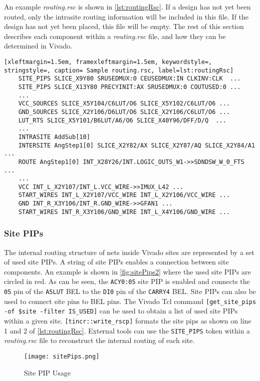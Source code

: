 \noindent An example \textit{routing.rsc} is shown in \autoref{lst:routingRsc}.
If a design has not yet been routed, only the intrasite routing information will be
included in this file. If the design has not yet been placed, this file will be
empty. The rest of this section describes each component within a
\textit{routing.rsc} file, and how they can be determined in Vivado.

\begin{lstlisting}[xleftmargin=1.5em, framexleftmargin=1.5em, keywordstyle=,
stringstyle=, caption= Sample routing.rsc, label=lst:routingRsc]
	SITE_PIPS SLICE_X9Y80 SRUSEDMUX:0 CEUSEDMUX:IN CLKINV:CLK  ...
	SITE_PIPS SLICE_X13Y80 PRECYINIT:AX SRUSEDMUX:0 COUTUSED:0 ...
	...
	VCC_SOURCES SLICE_X5Y104/C6LUT/O6 SLICE_X5Y102/C6LUT/O6 ...
	GND_SOURCES SLICE_X2Y106/D6LUT/O6 SLICE_X2Y106/C6LUT/O6 ...
	LUT_RTS SLICE_X5Y101/B6LUT/A6/O6 SLICE_X40Y96/DFF/D/Q  ...
	...
	INTRASITE AddSub[10]
	INTERSITE AngStep1[0] SLICE_X2Y82/AX SLICE_X2Y87/AQ SLICE_X2Y84/A1 ... 
	ROUTE AngStep1[0] INT_X28Y26/INT.LOGIC_OUTS_W1->>SDNDSW_W_0_FTS ...
	...
	VCC INT_L_X2Y107/INT_L.VCC_WIRE->>IMUX_L42 ...
	START_WIRES INT_L_X2Y107/VCC_WIRE INT_L_X2Y106/VCC_WIRE ...
	GND INT_R_X3Y106/INT_R.GND_WIRE->>GFAN1 ...
	START_WIRES INT_R_X3Y106/GND_WIRE INT_L_X4Y106/GND_WIRE ...
\end{lstlisting}

\subsubsection{Site PIPs}

The internal routing structure of nets inside Vivado sites are represented by
a set of used site PIPs. A string of site PIPs enables a connection between site
components. An example is shown in \autoref{fig:sitePips2} where the used site
PIPs are circled in red. As can be seen, the \texttt{ACY0:05} site PIP is
enabled and connects the \texttt{05} pin of the \texttt{A5LUT} BEL to the
\texttt{DI0} pin of the \texttt{CARRY4} BEL. Site PIPs can also be used to 
connect site pins to BEL pins. The Vivado Tcl command \texttt{[get\_site\_pips -of \$site -filter
IS\_USED]} can be used to obtain a list of used site PIPs within a given site.
\texttt{[tincr::write\_rscp]} formats the site pips as shown on line 1 and 2 of
\autoref{lst:routingRsc}. External tools can use the \texttt{SITE\_PIPS} token
within a \textit{routing.rsc} file to reconstruct the internal routing of
each site.

\begin{figure}[h!]
  \centering
  \texttt{[image: sitePips.png]}
  \caption{Site PIP Usage}
  \label{fig:sitePips2}
\end{figure}

